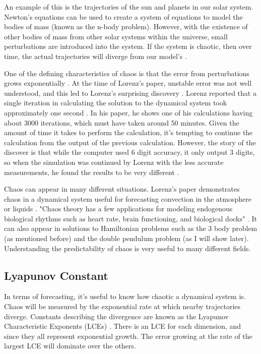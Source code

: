 \documentclass{article}
\begin{document}
An example of this is the trajectories of the sun and planets in our solar
system. Newton's equations can be used to create a system of equations to
model the bodies of mass (known as the n-body problem). However, with the
existence of other bodies of mass from other solar systems within the
universe, small perturbations are introduced into the system. If the system
is chaotic, then over time, the actual trajectories will diverge from our
model's \cite{oestreicher2007history}.

One of the defining characteristics of chaos is that the error from
perturbations grows exponentially \cite{oestreicher2007history}. At the time
of Lorenz's paper, unstable error was not well understood, and this led to
Lorenz's surprising discovery \cite{oestreicher2007history}. Lorenz reported
that a single iteration in calculating the solution to the dynamical system
took approximately one second \cite{lorenz1963deterministic}. In his paper,
he shows one of his calculations having about 3000 iterations, which must
have taken around 50 minutes. Given the amount of time it takes to perform
the calculation, it's tempting to continue the calculation from the output of
the previous calculation. However, the story of the discover is that while
the computer used 6 digit accuracy, it only output 3 digits, so when the
simulation was continued by Lorenz with the less accurate measurements, he
found the results to be very different \cite{oestreicher2007history}.

Chaos can appear in many different situations. Lorenz's paper demonstrates
chaos in a dynamical system useful for forecasting convection in the
atmosphere or liquids \cite{lorenz1963deterministic}. "Chaos theory has a few
applications for modeling endogenous biological rhythms such as heart rate,
brain functioning, and biological docks" \cite{oestreicher2007history}. It
can also appear in solutions to Hamiltonian problems such as the 3 body
problem (as mentioned before) and the double pendulum problem (as I will show
later). Understanding the predictability of chaos is very useful to many
different fields.

\subsection{Lyapunov Constant}

In terms of forecasting, it's useful to know how chaotic a dynamical system
is. Chaos will be measured by the exponential rate at which nearby
trajectories diverge. Constants describing the divergence are known as the
Lyapunov Characteristic Exponents (LCEs) \cite{sandri1996numerical}. There is
an LCE for each dimension, and since they all represent exponential growth.
The error growing at the rate of the largest LCE will dominate over the
others.
\end{document}
